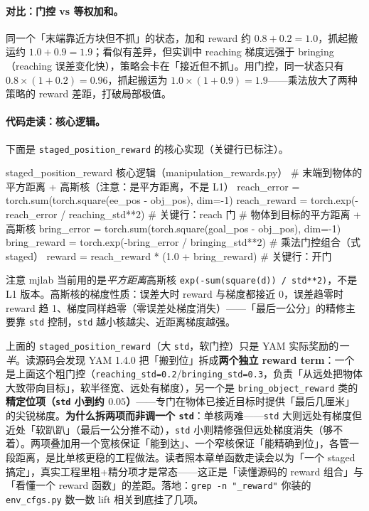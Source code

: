 \paragraph{对比：门控 vs 等权加和。}同一个「末端靠近方块但不抓」的状态，加和 reward 约 $0.8+0.2=1.0$，抓起搬运约 $1.0+0.9=1.9$；看似有差异，但实训中 reaching 梯度远强于 bringing（reaching 误差变化快），策略会卡在「接近但不抓」。用门控，同一状态只有 $0.8\times(1+0.2)=0.96$，抓起搬运为 $1.0\times(1+0.9)=1.9$——乘法放大了两种策略的 reward 差距，打破局部极值。

\paragraph{代码走读：核心逻辑。}下面是 \verb|staged_position_reward| 的核心实现（关键行已标注）。

\begin{codebox}[Python]{staged\_position\_reward 核心逻辑（manipulation\_rewards.py）}
# 末端到物体的平方距离 + 高斯核（注意：是平方距离，不是 L1）
reach_error  = torch.sum(torch.square(ee_pos - obj_pos), dim=-1)
reach_reward = torch.exp(-reach_error / reaching_std**2)   # 关键行：reach 门
# 物体到目标的平方距离 + 高斯核
bring_error  = torch.sum(torch.square(goal_pos - obj_pos), dim=-1)
bring_reward = torch.exp(-bring_error / bringing_std**2)
# 乘法门控组合（式 staged）
reward = reach_reward * (1.0 + bring_reward)              # 关键行：开门
\end{codebox}

注意 mjlab 当前用的是\emph{平方距离}高斯核 \verb|exp(-sum(square(d)) / std**2)|，不是 L1 版本。高斯核的梯度性质：误差大时 reward 与梯度都接近 0，误差趋零时 reward 趋 1、梯度同样趋零（零误差处梯度消失）——「最后一公分」的精修主要靠 \verb|std| 控制，\verb|std| 越小核越尖、近距离梯度越强。

\begin{insight}\label{ins:rlmc-manip-twostage}
上面的 \verb|staged_position_reward|（大 \verb|std|，软门控）只是 YAM 实际奖励的\emph{一半}。读源码会发现 YAM 1.4.0 把「搬到位」拆成\textbf{两个独立 reward term}：一个是上面这个粗门控（\verb|reaching_std=0.2|/\verb|bringing_std=0.3|，负责「从远处把物体大致带向目标」，软半径宽、远处有梯度），另一个是 \verb|bring_object_reward| 类的\textbf{精定位项（\texttt{std} 小到约 $0.05$）}——专门在物体已接近目标时提供「最后几厘米」的尖锐梯度。\textbf{为什么拆两项而非调一个 \texttt{std}}：单核两难——\verb|std| 大则远处有梯度但近处「软趴趴」（最后一公分推不动），\verb|std| 小则精修强但远处梯度消失（够不着）。两项叠加用一个宽核保证「能到达」、一个窄核保证「能精确到位」，各管一段距离，是比单核更稳的工程做法。读者照本章单函数走读会以为「一个 staged 搞定」，真实工程里粗+精分项才是常态——这正是「读懂源码的 reward 组合」与「看懂一个 reward 函数」的差距。落地：\verb|grep -n "_reward"| 你装的 \verb|env_cfgs.py| 数一数 lift 相关到底挂了几项。
\end{insight}


